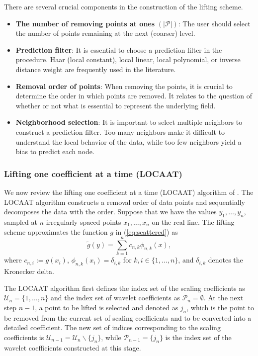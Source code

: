 \documentclass[11pt,titlepage]{article}
\begin{document}
There are several crucial components in the construction of the lifting scheme.
\begin{itemize}
	\item \textbf{The number of removing points at ones} $(|\mathcal{P}|)$: The user should select the number of points remaining at the next (coarser) level.  
		
	\item \textbf{Prediction filter}: It is essential to choose a prediction filter in the procedure. Haar (local constant), local linear, local polynomial, or inverse distance weight are frequently used in the literature.  
	
	\item \textbf{Removal order of points}: When removing the points, it is crucial to determine the order in which points are removed. It relates to the question of whether or not what is essential to represent the underlying field. 	
	
	\item \textbf{Neighborhood selection}: It is important to select multiple neighbors to construct a prediction filter. Too many neighbors make it difficult to understand the local behavior of the data, while too few neighbors yield a bias to predict each node.
\end{itemize}

\subsubsection{Lifting one coefficient at a time (LOCAAT)}\label{sec:LOCAAT}
We now review the lifting one coefficient at a time (LOCAAT) algorithm of \cite{Jansen2009}. The LOCAAT algorithm constructs a removal order of data points and sequentially decomposes the data with the order. Suppose that we have the values $y_{1}, \ldots, y_{n}$, sampled at $n$ irregularly spaced points $x_{1}, \ldots, x_{n}$ on the real line. The lifting scheme approximates the function $g$ in (\ref{eq:scattered}) as 
\[
\tilde{g}(y) = \sum_{k=1}^{n} c_{n,k} \phi_{n,k}(x),
\] 
where $c_{n,i}:=g(x_{i})$, $\phi_{n,k} (x_{i}) = \delta_{i,k}$ for $k,i \in \{1, \ldots, n\}$, and $\delta_{i,k}$ denotes the Kronecker delta. 

The LOCAAT algorithm first defines the index set of the scaling coefficients as $\mathcal{U}_{n} = \{1,\ldots,n\}$ and the index set of wavelet coefficients as $\mathcal{P}_{n} = \emptyset$. At the next step $n-1$, a point to be lifted is selected and denoted as $j_{n}$, which is the point to be removed from the current set of scaling coefficients and to be converted into a detailed coefficient. The new set of indices corresponding to the scaling coefficients is $\mathcal{U}_{n-1} = \mathcal{U}_{n} \backslash \{j_{n}\}$, while $\mathcal{P}_{n-1} = \{ j_{n}\}$ is the index set of the wavelet coefficients constructed at this stage.
\end{document}
